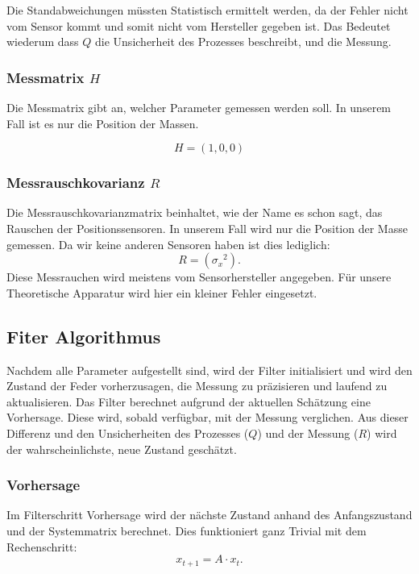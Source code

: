 \documentclass[11pt,a4paper]{article}
\begin{document}
Die Standabweichungen müssten Statistisch ermittelt werden, da der Fehler nicht vom Sensor kommt und somit nicht vom Hersteller gegeben ist. Das Bedeutet wiederum dass $Q$ die Unsicherheit des Prozesses beschreibt, und die Messung. 

\subsubsection*{Messmatrix $H$}
Die Messmatrix gibt an, welcher Parameter gemessen werden soll. In unserem Fall ist es nur die Position der Massen. 

\[ H = (1, 0, 0) \]


\subsubsection*{Messrauschkovarianz $R$}
Die Messrauschkovarianzmatrix beinhaltet, wie der Name es schon sagt, das Rauschen der Positionssensoren. In unserem Fall wird nur die Position der Masse gemessen. Da wir keine anderen Sensoren haben ist dies lediglich:
\begin{equation}
R= ({\sigma_x}^2).
\end{equation} 
Diese Messrauchen wird meistens vom Sensorhersteller angegeben. Für unsere Theoretische Apparatur wird hier ein kleiner Fehler eingesetzt.

\subsection{Fiter Algorithmus}
Nachdem alle Parameter aufgestellt sind, wird der Filter initialisiert und wird den Zustand der Feder vorherzusagen, die Messung zu präzisieren und laufend zu aktualisieren. Das Filter berechnet aufgrund der aktuellen Schätzung eine Vorhersage. Diese wird, sobald verfügbar, mit der Messung verglichen. Aus dieser Differenz und den Unsicherheiten des Prozesses ($Q$) und der Messung ($R$) wird der wahrscheinlichste, neue Zustand geschätzt.


\subsubsection*{Vorhersage}
Im Filterschritt Vorhersage wird der nächste Zustand anhand des Anfangszustand und der Systemmatrix berechnet. Dies funktioniert ganz Trivial mit dem Rechenschritt:
\begin{equation}
{x_{t+1}}=A\cdot{x_t}.
\end{equation} 
\end{document}
